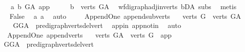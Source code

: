 \begin{isabellebody}
\ \ \ a{}{\isacharcolon}{\kern0pt}\ {\isachardoublequoteopen}b\ {\isasymrightarrow}\isactrlbsub G{\isacharunderscore}{\kern0pt}A\isactrlesub \ app{\isachardoublequoteclose}\isanewline
\ \ \isamarkupfalse%
\ \isamarkupfalse%
\ {\isachardoublequoteopen}b\ {\isasymin}\ verts\ G{\isacharunderscore}{\kern0pt}A{\isachardoublequoteclose}\ \isamarkupfalse%
\ wf{\isacharunderscore}{\kern0pt}digraph{\isachardot}{\kern0pt}adj{\isacharunderscore}{\kern0pt}in{\isacharunderscore}{\kern0pt}verts{\isacharparenleft}{\kern0pt}{}{\isacharparenright}{\kern0pt}\ bD{\isacharunderscore}{\kern0pt}A\ subs\ \isamarkupfalse%
\ metis\isanewline
\ \ \isamarkupfalse%
\ \isamarkupfalse%
\ {\isachardoublequoteopen}False{\isachardoublequoteclose}\ \isamarkupfalse%
\ a{}\ a{}\ \isamarkupfalse%
\ auto\isanewline
{}\isamarkupfalse%
%
\endisatagproof
{\isafoldproof}%
%
\isadelimproof
\isanewline
%
\endisadelimproof
\ \ \isanewline
{}\isamarkupfalse%
\ {\isacharparenleft}{\kern0pt}\ Append{\isacharunderscore}{\kern0pt}One{\isacharparenright}{\kern0pt}\ append{\isacharunderscore}{\kern0pt}subverts{\isacharcolon}{\kern0pt}\ \isanewline
\ \ {\isachardoublequoteopen}verts\ G\ {\isasymsubset}\ verts\ G{\isacharunderscore}{\kern0pt}A{\isachardoublequoteclose}\isanewline
%
\isadelimproof
\ \ %
\endisadelimproof
%
\isatagproof
{}\isamarkupfalse%
\ GG{\isacharunderscore}{\kern0pt}A\ \ pre{\isacharunderscore}{\kern0pt}digraph{\isachardot}{\kern0pt}verts{\isacharunderscore}{\kern0pt}del{\isacharunderscore}{\kern0pt}vert\ \isamarkupfalse%
\ app{\isacharunderscore}{\kern0pt}in\ app{\isacharunderscore}{\kern0pt}notin\ \isamarkupfalse%
\ auto%
\endisatagproof
{\isafoldproof}%
%
\isadelimproof
\isanewline
%
\endisadelimproof
\isanewline
{}\isamarkupfalse%
\ {\isacharparenleft}{\kern0pt}\ Append{\isacharunderscore}{\kern0pt}One{\isacharparenright}{\kern0pt}\ append{\isacharunderscore}{\kern0pt}verts{\isacharcolon}{\kern0pt}\ \isanewline
\ \ {\isachardoublequoteopen}verts\ G{\isacharunderscore}{\kern0pt}A\ {\isacharequal}{\kern0pt}\ verts\ G\ {\isasymunion}\ {\isacharbraceleft}{\kern0pt}app{\isacharbraceright}{\kern0pt}{\isachardoublequoteclose}\isanewline
%
\isadelimproof
\ \ %
\endisadelimproof
%
\isatagproof
{}\isamarkupfalse%
\ GG{\isacharunderscore}{\kern0pt}A\ \ pre{\isacharunderscore}{\kern0pt}digraph{\isachardot}{\kern0pt}verts{\isacharunderscore}{\kern0pt}del{\isacharunderscore}{\kern0pt}vert\ \isamarkupfalse%

\end{isabellebody}
